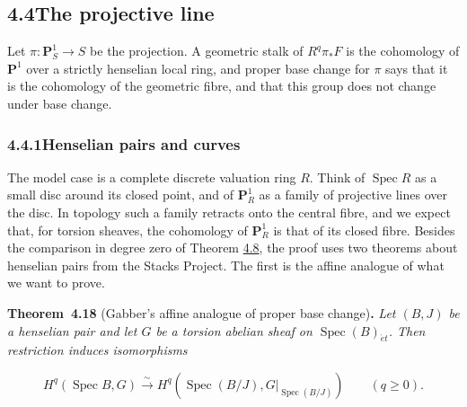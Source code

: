 \documentclass[11pt]{article}
\newenvironment{bpstatement}[2]{\par\addvspace{0.6\baselineskip}\noindent\textbf{#1}#2\textbf{.}\enspace\ignorespaces}
  {\par\addvspace{0.4\baselineskip}}
\newenvironment{bpstatementit}[2]{\begin{bpstatement}{#1}{#2}\itshape\ignorespaces}{\end{bpstatement}}
\begin{document}
\subsection*{\texorpdfstring{4.4\quad The projective line}{4.4 The projective line}}
\label{bp47}%
\label{bp48}%
Let \(\pi:\mathbf P^1_S\to S\) be the projection. A geometric stalk of \(R^q\pi_*F\) is the cohomology of \(\mathbf P^1\) over a strictly henselian local ring, and proper base change for \(\pi\) says that it is the cohomology of the geometric fibre, and that this group does not change under base change.

\subsubsection*{\texorpdfstring{4.4.1\quad Henselian pairs and curves}{4.4.1 Henselian pairs and curves}}
\label{bp49}%
\label{bp50}%
The model case is a complete discrete valuation ring \(R\). Think of \(\operatorname{Spec}R\) as a small disc around its closed point, and of \(\mathbf P^1_R\) as a family of projective lines over the disc. In topology such a family retracts onto the central fibre, and we expect that, for torsion sheaves, the cohomology of \(\mathbf P^1_R\) is that of its closed fibre. Besides the comparison in degree zero of Theorem \hyperref[bp24]{4.8}, the proof uses two theorems about henselian pairs from the Stacks Project. The first is the affine analogue of what we want to prove.

\label{bp51}%
\begin{bpstatementit}{Theorem~4.18}{ (Gabber's affine analogue of proper base change)}
Let \((B,J)\) be a henselian pair and let \(G\) be a torsion abelian sheaf on \(\operatorname{Spec}(B)_{\acute{e}t}\). Then restriction induces isomorphisms

\[
H^q(\operatorname{Spec}B,G)
\xrightarrow{\sim}
H^q(\operatorname{Spec}(B/J),G|_{\operatorname{Spec}(B/J)})
\qquad(q\geq0).
\]
\end{bpstatementit}
\end{document}
